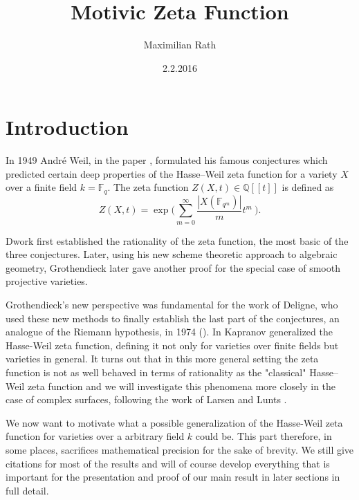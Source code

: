\documentclass[11pt, a4paper, german]{article}
\author{Maximilian Rath}
\date{2.2.2016}
\title{Motivic Zeta Function}
\theoremstyle{plain}
\newtheorem{theorem}{Theorem}
\theoremstyle{definition}
\begin{document}
\maketitle
\section{Introduction}

In 1949 Andr\'e Weil, in the paper \cite{weil1949}, formulated his famous conjectures
which predicted certain deep properties of the Hasse--Weil zeta function for a variety $X$ over a finite field $k = \mathbb{F}_q$. 
The zeta function $Z(X,t) \in \mathbb{Q}[[t]]$ is defined as
\[
    Z(X,t) = \exp \big(\sum_{m=0}^\infty \frac{|X(\mathbb{F}_{q^m})|}{m} t^m \ \big).
\]

Dwork first established the rationality of the zeta function, the most basic of the three conjectures. 
Later, using his new scheme theoretic approach to algebraic geometry, Grothendieck later gave another proof for the special case of 
smooth projective varieties.


Grothendieck's new perspective was fundamental for the work of Deligne, who used these new methods to finally establish the 
last part of the conjectures, an analogue of the Riemann hypothesis, in 1974 (\cite{MR0340258}).
In \cite{kapranov} Kapranov generalized the Hasse-Weil zeta function, defining it not only for varieties over finite fields
but varieties in general. It turns out that in this more general setting the zeta function is not as well behaved in terms of rationality as
the "classical" Hasse--Weil zeta function and we will investigate this phenomena more closely in the case of complex surfaces, following the 
work of Larsen and Lunts \cite{MR1996804}.

We now want to motivate what a possible generalization of the Hasse-Weil zeta function for varieties over a arbitrary field $k$ could be.
This part therefore, in some places, sacrifices mathematical precision for the sake of brevity.  
We still give citations for most of the results and will of course develop everything that is important for the presentation and proof 
of our main result in later sections in full detail.
\end{document}
